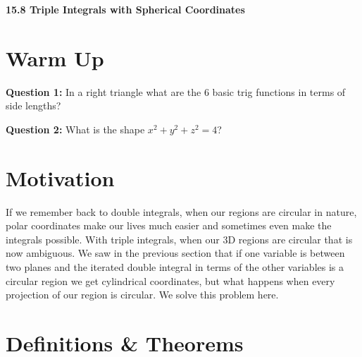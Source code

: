 \documentclass[11pt]{article}
\newcommand{\vs}{\vspace*{.1in}}
\begin{document}
\begin{LARGE}\begin{center}\bf 15.8 Triple Integrals with Spherical Coordinates\end{center}
\end{LARGE}

\vs\vs



\section{Warm Up}
\textbf{Question 1:} In a right triangle what are the 6 basic trig functions in terms of side lengths?

\textbf{Question 2:} What is the shape $x^2+y^2+z^2=4$?

\section{Motivation}

If we remember back to double integrals, when our regions are circular in nature, polar coordinates make our lives much easier and sometimes even make the integrals possible. With triple integrals, when our 3D regions are circular that is now ambiguous. We saw in the previous section that if one variable is between two planes and the iterated double integral in terms of the other variables is a circular region we get cylindrical coordinates, but what happens when every projection of our region is circular. We solve this problem here.


\section{Definitions \& Theorems}
\end{document}
